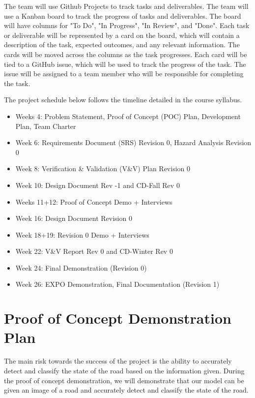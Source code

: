 \documentclass{article}
\begin{document}
The team will use Github Projects to track tasks and deliverables. The team will use a Kanban board to track the progress of tasks and deliverables. The board will have columns for "To Do", "In Progress", "In Review", and "Done".
Each task or deliverable will be represented by a card on the board, which will contain a description of the task, expected outcomes, and any relevant information. The cards will be moved across the columns as the task progresses.
Each card will be tied to a GitHub issue, which will be used to track the progress of the task. The issue will be assigned to a team member who will be responsible for completing the task.

The project schedule below follows the timeline detailed in the course syllabus.
 \begin{itemize}
   \item Weeks 4: Problem Statement, Proof of Concept (POC) Plan, Development Plan, Team Charter
   \item Week 6: Requirements Document (SRS) Revision 0, Hazard Analysis Revision 0
   \item Week 8: Verification \& Validation (V\&V) Plan Revision 0
   \item Week 10: Design Document Rev -1 and CD-Fall Rev 0
   \item Weeks 11+12: Proof of Concept Demo + Interviews
   \item Week 16: Design Document Revision 0
   \item Week 18+19: Revision 0 Demo + Interviews
   \item Week 22: V\&V Report Rev 0 and CD-Winter Rev 0
   \item Week 24: Final Demonstration (Revision 0)
   \item Week 26: EXPO Demonstration, Final Documentation (Revision 1)
 \end{itemize}

\section{Proof of Concept Demonstration Plan}

The main risk towards the success of the project is the ability to accurately detect and classify the state of the road based on the information given.
During the proof of concept demonstration, we will demonstrate that our model can be given an image of a road and accurately detect and classify the state of the road.
\end{document}
